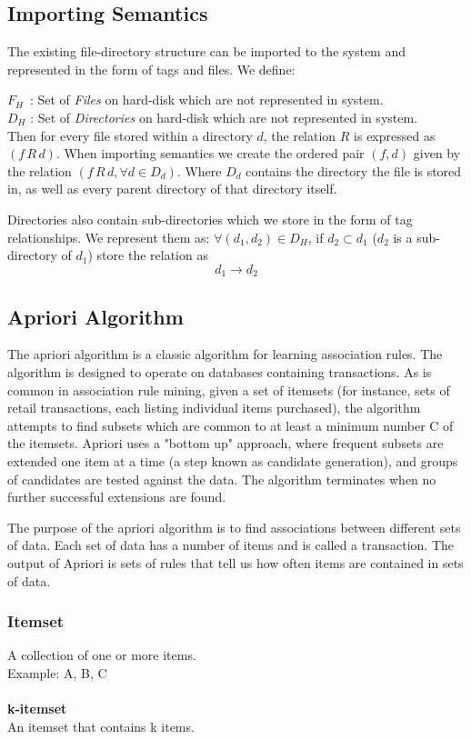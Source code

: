 \subsection{Importing Semantics}
The existing file-directory structure can be imported to the system and represented in the form of tags and files. We define: 

\noindent $F_{H} \, $  : Set of \emph{Files} on hard-disk which are not represented in system.\\
$D_{H}$ : Set of \emph{Directories} on hard-disk which are not represented in system. \\

\noindent Then for every file stored within a directory $d$, the relation $R$ is expressed as 
$(f  \, R  \, d)$.
When importing semantics we create the ordered pair $(f,d)$ given by the relation $(f  \, R \,  d, \forall d \in D_{d})$. Where $D_{d}$ contains the directory the file is stored in, as well as every parent directory of that directory itself.

\noindent Directories also contain sub-directories which we store in the form of tag relationships. We represent them as:
$\forall (d_{1}, d_{2}) \in D_{H}$, if $d_{2} \subset d_{1}$ ($d_{2}$ is a sub-directory of $d_{1}$) store the relation as
$$d_{1} \to d_{2}$$


\subsection{Apriori Algorithm}
The apriori algorithm\cite{FastAlgo} is a classic algorithm for learning association rules. The
 algorithm is designed to operate on databases containing transactions. As is
common in association rule mining, given a set of itemsets (for instance, sets
of retail transactions, each listing individual items purchased), the algorithm
attempts to find subsets which are common to at least a minimum number C of the
itemsets. Apriori uses a "bottom up" approach, where frequent subsets are
extended one item at a time (a step known as candidate generation), and groups
of candidates are tested against the data. The algorithm terminates when no
further successful extensions are found.

The purpose of the apriori algorithm is to find associations between different sets of data.
Each set of data has a number of items and is called a transaction.
The output of Apriori is sets of rules that tell us how often items are contained in sets of data.

\subsubsection{Itemset}
A collection of one or more items. \\
Example: {A, B, C} \\ \\
\textbf{k-itemset} \\
An itemset that contains k items.

